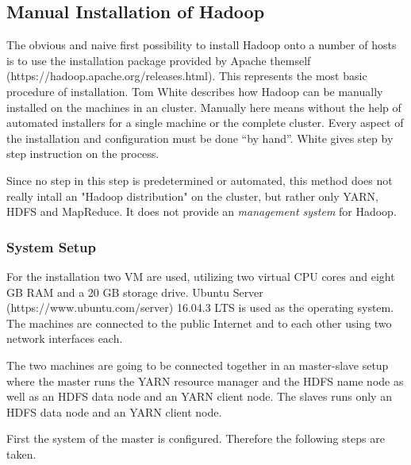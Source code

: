 \subsection{Manual Installation of Hadoop}

The obvious and naive first possibility to install Hadoop onto a number of hosts 
is to use the installation package provided by Apache themself (https://hadoop.apache.org/releases.html).
This represents the most basic procedure of installation.
Tom White \autocite[][Appendix A]{white2015hadoop} describes how Hadoop can be manually installed on the machines in an cluster. 
Manually here means without the help of automated installers for a single machine or the complete cluster. 
Every aspect of the installation and configuration must be done \enquote{by hand}.
White gives step by step instruction on the process.

Since no step in this step is predetermined or automated, this method does not really intall an "Hadoop distribution" on the cluster, but rather only \ac{YARN}, \ac{HDFS} and MapReduce.
It does not provide an \emph{management system} for Hadoop.

\subsubsection{System Setup}
For the installation two \acs{VM} are used, utilizing two virtual \ac{CPU} cores and eight \ac{GB} \ac{RAM} and a 20 \ac{GB} storage drive. 
Ubuntu Server (https://www.ubuntu.com/server) 16.04.3 \ac{LTS} is used as the operating system. 
The machines are connected to the public Internet and to each other using two network interfaces each.

The two machines are going to be connected together in an master-slave setup
where the master runs the \ac{YARN} resource manager and the \ac{HDFS} name node as well as an \ac{HDFS} data node and an \ac{YARN} client node.
The slaves runs only an \ac{HDFS} data node and an \ac{YARN} client node.

First the system of the master is configured. Therefore the following steps are taken.

